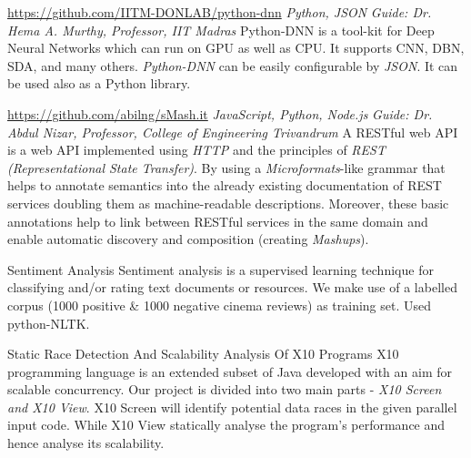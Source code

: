 \documentclass[11pt, a4paper, sans]{moderncv}
\begin{document}
{\newline \url{https://github.com/IITM-DONLAB/python-dnn}}
{\hfill \textit{Python, JSON}}
{\newline \textit{Guide: Dr. Hema A. Murthy, Professor, IIT Madras}}
{Python-DNN is a tool-kit for Deep Neural Networks which can run on GPU as well as CPU. It supports CNN, DBN, SDA, and many others. \textit{Python-DNN} can be easily configurable by \textit{JSON}. It can be used also as a Python library. \newline}

{\newline \url{https://github.com/abilng/sMash.it}}
{\hfill \textit{JavaScript, Python, Node.js}}
{\newline \textit{Guide: Dr. Abdul Nizar, Professor, College of Engineering Trivandrum}}
{A RESTful web API is a web API implemented using \textit{HTTP }and the principles of \textit{REST (Representational State Transfer)}. By using  a \textit{Microformats}-like grammar that helps to annotate semantics into the already existing documentation of REST services doubling them as machine-readable descriptions. Moreover, these basic annotations help to link between RESTful services in the same domain and enable automatic discovery and composition (creating \textit{Mashups}). \newline}

\iffalse


{Sentiment Analysis}{}{}{}
{Sentiment analysis is a supervised learning technique for classifying and/or rating text documents or resources. We make use of a labelled corpus (1000 positive \& 1000 negative cinema reviews) as training set. Used python-NLTK. \newline}

{Static Race Detection And Scalability Analysis Of X10 Programs}{}{}{}
{X10 programming language is an extended subset of Java developed with an aim for
scalable concurrency. Our project is divided into two main parts - \textit{X10 Screen and X10 View}. X10 Screen will identify potential data races in the given parallel input code. While X10 View statically analyse the program's performance and hence analyse its scalability. \newline}
\end{document}
